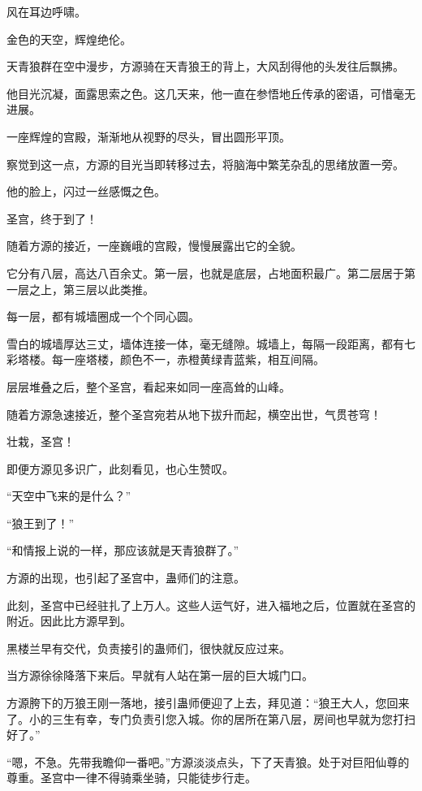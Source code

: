 
\begin{this_body}

风在耳边呼啸。

金色的天空，辉煌绝伦。

天青狼群在空中漫步，方源骑在天青狼王的背上，大风刮得他的头发往后飘拂。

他目光沉凝，面露思索之色。这几天来，他一直在参悟地丘传承的密语，可惜毫无进展。

一座辉煌的宫殿，渐渐地从视野的尽头，冒出圆形平顶。

察觉到这一点，方源的目光当即转移过去，将脑海中繁芜杂乱的思绪放置一旁。

他的脸上，闪过一丝感慨之色。

圣宫，终于到了！

随着方源的接近，一座巍峨的宫殿，慢慢展露出它的全貌。

它分有八层，高达八百余丈。第一层，也就是底层，占地面积最广。第二层居于第一层之上，第三层以此类推。

每一层，都有城墙圈成一个个同心圆。

雪白的城墙厚达三丈，墙体连接一体，毫无缝隙。城墙上，每隔一段距离，都有七彩塔楼。每一座塔楼，颜色不一，赤橙黄绿青蓝紫，相互间隔。

层层堆叠之后，整个圣宫，看起来如同一座高耸的山峰。

随着方源急速接近，整个圣宫宛若从地下拔升而起，横空出世，气贯苍穹！

壮栽，圣宫！

即便方源见多识广，此刻看见，也心生赞叹。

“天空中飞来的是什么？”

“狼王到了！”

“和情报上说的一样，那应该就是天青狼群了。”

方源的出现，也引起了圣宫中，蛊师们的注意。

此刻，圣宫中已经驻扎了上万人。这些人运气好，进入福地之后，位置就在圣宫的附近。因此比方源早到。

黑楼兰早有交代，负责接引的蛊师们，很快就反应过来。

当方源徐徐降落下来后。早就有人站在第一层的巨大城门口。

方源胯下的万狼王刚一落地，接引蛊师便迎了上去，拜见道：“狼王大人，您回来了。小的三生有幸，专门负责引您入城。你的居所在第八层，房间也早就为您打扫好了。”

“嗯，不急。先带我瞻仰一番吧。”方源淡淡点头，下了天青狼。处于对巨阳仙尊的尊重。圣宫中一律不得骑乘坐骑，只能徒步行走。


\end{this_body}
